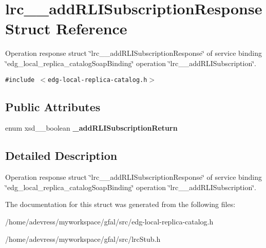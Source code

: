 \section{lrc\_\-\_\-add\-RLISubscription\-Response Struct Reference}
\label{structlrc____addRLISubscriptionResponse}
Operation response struct \char`\"{}lrc\_\-\_\-add\-RLISubscription\-Response\char`\"{} of service binding \char`\"{}edg\_\-local\_\-replica\_\-catalog\-Soap\-Binding\char`\"{} operation \char`\"{}lrc\_\-\_\-add\-RLISubscription\char`\"{}.  


{\tt \#include $<$edg-local-replica-catalog.h$>$}

\subsection*{Public Attributes}
\begin{CompactItemize}
\item 
enum xsd\_\-\_\-boolean \textbf{\_\-add\-RLISubscription\-Return}\label{structlrc____addRLISubscriptionResponse_83eb81165463760fb4517e3564b53be9}

\end{CompactItemize}


\subsection{Detailed Description}
Operation response struct \char`\"{}lrc\_\-\_\-add\-RLISubscription\-Response\char`\"{} of service binding \char`\"{}edg\_\-local\_\-replica\_\-catalog\-Soap\-Binding\char`\"{} operation \char`\"{}lrc\_\-\_\-add\-RLISubscription\char`\"{}. 



The documentation for this struct was generated from the following files:\begin{CompactItemize}
\item 
/home/adevress/myworkspace/gfal/src/edg-local-replica-catalog.h\item 
/home/adevress/myworkspace/gfal/src/lrc\-Stub.h\end{CompactItemize}

